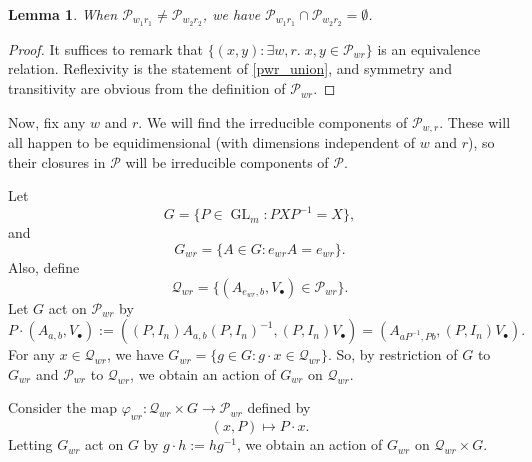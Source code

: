 \documentclass[12pt,psamsfonts]{article}
\DeclareMathOperator{\GL}{GL}
\newtheorem{lemma}[theorem]{Lemma}
\begin{document}
\begin{lemma}
    When \(\mathcal{P}_{w_1r_1} \neq \mathcal{P}_{w_2r_2}\), we have \(\mathcal{P}_{w_1r_1} \cap \mathcal{P}_{w_2r_2} = \emptyset\). 
\end{lemma}
\begin{proof}
    It suffices to remark that \(\{(x,y) : \exists w,r. \; x,y \in \mathcal{P}_{wr}\}\) is an equivalence relation.
    Reflexivity is the statement of \cref{pwr_union}, and symmetry and transitivity are obvious from the definition of \(\mathcal{P}_{wr}\).
\end{proof}

Now, fix any \(w\) and \(r\).
We will find the irreducible components of \(\mathcal{P}_{w,r}\).
These will all happen to be equidimensional (with dimensions independent of \(w\) and \(r\)), so their closures in \(\mathcal{P}\) will be irreducible components of \(\mathcal{P}\).
\par Let 
\[G = \{P \in \GL_m : P X P^{-1} = X\},\]
and
\[G_{wr} = \{A \in G : e_{wr}A = e_{wr}\}.\]
Also, define 
\[\mathcal{Q}_{wr} = \{(A_{e_{wr}, b}, V_\bullet) \in \mathcal{P}_{wr}\}.\]
Let \(G\) act on \(\mathcal{P}_{wr}\) by
\[P \cdot (A_{a,b}, V_\bullet) := ((P, I_n) A_{a, b} (P, I_n)^{-1}, (P, I_n)V_\bullet) = (A_{a P^{-1}, Pb}, (P, I_n) V_\bullet).\]
For any \(x \in \mathcal{Q}_{wr}\), we have \(G_{wr} = \{g \in G : g \cdot x \in \mathcal{Q}_{wr}\}\).
So, by restriction of \(G\) to \(G_{wr}\) and \(\mathcal{P}_{wr}\) to \(\mathcal{Q}_{wr}\), we obtain an action of \(G_{wr}\) on \(\mathcal{Q}_{wr}\).
\par Consider the map \(\varphi_{wr} : \mathcal{Q}_{wr} \times G \to \mathcal{P}_{wr}\) defined by
\[(x, P) \mapsto P \cdot x.\]
Letting \(G_{wr}\) act on \(G\) by \(g \cdot h := hg^{-1}\), we obtain an action of \(G_{wr}\) on \(\mathcal{Q}_{wr} \times G\).
\end{document}
